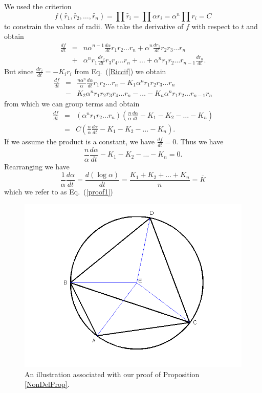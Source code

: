 \documentclass[12pt]{article}
\begin{document}
	We used the criterion $$f(\tilde{r_1},\tilde{r_2},\ldots,\tilde{r_n}) = \prod{\tilde{r_i}} = \prod{\alpha r_i} = \alpha^n\prod{r_i}= C$$ to constrain the values of radii. We take the derivative of $f$ with respect to $t$ and obtain
	\begin{eqnarray*}
	\frac{df}{dt} & = & n\alpha^{n-1}\frac{d\alpha}{dt}r_1r_2\ldots r_n + \alpha^n\frac{dr_1}{dt}r_2r_3\ldots r_n\\
								& + & \alpha^nr_1\frac{dr_2}{dt}r_3r_4\ldots r_n + \ldots + \alpha^nr_1r_2\ldots r_{n-1}\frac{dr_n}{dt}.
	\end{eqnarray*}
	But since $\displaystyle \frac{dr_i}{dt} = -K_ir_i$ from Eq.~(\ref{Riccif}) we obtain
	\begin{eqnarray*}
	\frac{df}{dt} & = & \frac{n\alpha^{n}}{\alpha}\frac{d\alpha}{dt}r_1r_2\ldots r_n - K_1\alpha^nr_1r_2r_3\ldots r_n\\
								& - & K_2\alpha^nr_1r_2r_3r_4\ldots r_n - \ldots - K_n\alpha^nr_1r_2\ldots r_{n-1}r_n
	\end{eqnarray*}
	from which we can group terms and obtain
	\begin{eqnarray*}
	\frac{df}{dt} & = & (\alpha^nr_1r_2\ldots r_n)(\frac{n}{\alpha}\frac{d\alpha}{dt} - K_1 - K_2 - \ldots - K_n)\\
								& = & C(\frac{n}{\alpha}\frac{d\alpha}{dt} - K_1 - K_2 - \ldots - K_n).
	\end{eqnarray*}
	If we assume the product is a constant, we have $\displaystyle \frac{df}{dt} = 0.$ Thus we have $$\frac{n}{\alpha}\frac{d\alpha}{dt} - K_1 - K_2 - \ldots - K_n = 0.$$
	Rearranging we have
$$\frac{1}{\alpha}\frac{d\alpha}{dt} = \frac{d(\log \alpha)}{dt} = \frac{K_1 + K_2 + \ldots + K_n}{n} = \overline{K}$$
	which we refer to as Eq.~(\ref{proof1})

\begin{figure}
\label{NonDelPropfig}
\centering
\includegraphics[scale = 0.5]{Pictures/geometryU.png}
\caption{An illustration associated with our proof of Proposition \ref{NonDelProp}.}
\end{figure}
\end{document}
